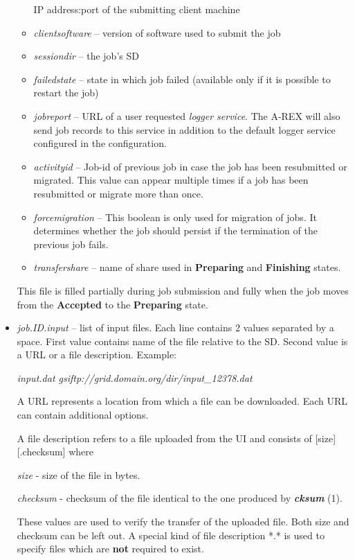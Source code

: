 \documentclass{article}                            %
\begin{document}
\begin{itemize}
\begin{itemize}
IP address:port of the submitting client machine
\item \textit{clientsoftware} -- version of software used to submit the job
\item \textit{sessiondir} -- the job's SD
\item \textit{failedstate} -- state in which job failed (available only if
it is possible to restart the job)
\item \textit{jobreport} -- URL of a user requested \emph{logger service}.
The A-REX will also send job records to this service in addition to
the default logger service configured in the configuration.
\item \textit{activityid} -- Job-id of previous job in case the job has been 
resubmitted or migrated. This value can appear multiple times if a job has been 
resubmitted or migrate more than once.
\item \textit{forcemigration} -- This boolean is only used for migration of jobs.
It determines whether the job should persist if the termination of the previous 
job fails.
\item \textit{transfershare} -- name of share used in \textbf{Preparing}
and \textbf{Finishing} states.
\end{itemize}

This file is filled partially during job submission and fully when
the job moves from the \textbf{Accepted} to the \textbf{Preparing}
state.

\item \textit{job.ID.input} -- list of input files. Each line contains 2
values separated by a space. First value contains name of the file
relative to the SD. Second value is a URL or a file description.
Example:


\hspace*{1cm}\textit{input.dat gsiftp://grid.domain.org/dir/input\_12378.dat}

A URL represents a location from which a file can be downloaded.
Each URL can contain additional options.

A file description refers to a file uploaded from the UI and consists
of {[}size]{[}.checksum] where

\hspace*{1cm}\textit{size} - size of the file in bytes.

\hspace*{1cm}\textit{checksum} - checksum of the file identical to
the one produced by \textbf{\textit{cksum}} (1).

These values are used to verify the transfer of the uploaded
file. Both size and checksum can be left out. A special kind of file
description {*}.{*} is used to specify files which are \textbf{not}
required to exist.


\end{itemize}
\end{document}

